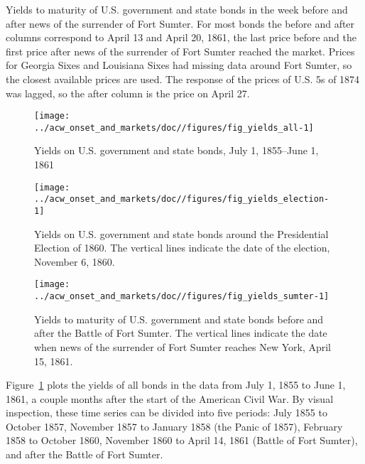 \begin{table}
  \centering
  

\caption[Yields to maturity of U.S. government and state bonds in the week before and after news of the surrender of Fort Sumter.]{
  Yields to maturity of U.S. government and state bonds in the week before and after news of the surrender of Fort Sumter.
  For most bonds the before and after columns correspond to April 13 and April 20, 1861, the last price before and the first price after news of the surrender of Fort Sumter reached the market.
  Prices for Georgia Sixes and Louisiana Sixes had missing data around Fort Sumter, so the closest available prices are used.
  The response of the prices of U.S. 5s of 1874 was lagged, so the after column is the price on April 27.}
\label{acw_onset:tab:sumter}

\end{table}

\begin{figure}
  \centering
  \texttt{[image: ../acw\_onset\_and\_markets/doc//figures/fig\_yields\_all-1]}
\caption{Yields on U.S. government and state bonds, July  1, 1855--June  1, 1861}
\label{acw_onset:fig:yields_all}
\end{figure}


\begin{figure}
  \centering
  \texttt{[image: ../acw\_onset\_and\_markets/doc//figures/fig\_yields\_election-1]}
\caption[Yields on U.S. government and state bonds around the Presidential Election of 1860]{
  Yields on U.S. government and state bonds around the Presidential Election of 1860.
  The vertical lines indicate the date of the election, November 6, 1860.
}
\label{acw_onset:fig:yields_election}
\end{figure}

\begin{figure}
  \centering
  \texttt{[image: ../acw\_onset\_and\_markets/doc//figures/fig\_yields\_sumter-1]}
\caption[Yields to maturity of U.S. government and state bonds before and after the Battle of Fort Sumter.]{
  Yields to maturity of U.S. government and state bonds before and after the Battle of Fort Sumter.
  The vertical lines indicate the date when news of the surrender of Fort Sumter reaches New York, April 15, 1861.
}
\label{acw_onset:fig:yields_sumter}
\end{figure}

Figure~\ref{acw_onset:fig:yields_all} plots the yields of all bonds in the data from July  1, 1855 to June  1, 1861, a couple months after the start of the American Civil War.
By visual inspection, these time series can be divided into five periods:
July 1855 to October 1857,
November 1857 to January 1858 (the Panic of 1857),
February 1858 to October 1860,
November 1860 to April 14, 1861 (Battle of Fort Sumter),
and after the Battle of Fort Sumter.




